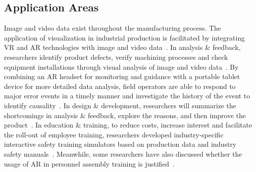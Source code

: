 \documentclass[a4paper,fleqn]{cas-dc}
\begin{document}
\subsection{Application Areas}
Image and video data exist throughout the manufacturing process. The application of visualization in industrial production is facilitated by integrating VR and AR technologies with image and video data~\cite{hamid2014virtual,Satkowski2021}. 
In analysis \& feedback, researchers identify product defects, verify machining processes and check equipment installations through visual analysis of image and video data~\cite{Cirp2019,Murithi2020,tao2020machining}. 
By combining an AR headset for monitoring and guidance with a portable tablet device for more detailed data analysis, field operators are able to respond to major error events in a timely manner and investigate the history of the event to identify causality~\cite{Becher2022,Murithi2020,North2021,Satkowski2021}.
In design \& development, researchers will summarize the shortcomings in analysis \& feedback, explore the reasons, and then improve the product~\cite{Townsend2022}.
In education \& training, to reduce costs, increase interest and facilitate the roll-out of employee training, researchers developed industry-specific interactive safety training simulators based on production data and industry safety manuals~\cite{Moreland2019,Pantforder2009}. Meanwhile, some researchers have also discussed whether the usage of AR in personnel assembly training is justified~\cite{buttner2020augmented}.


\end{document}
